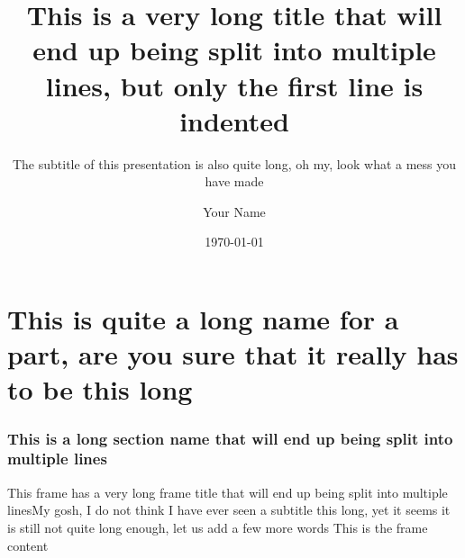 \documentclass[t]{beamer}
\title{This is a very long title that will end up being split into multiple lines, but only the first line is indented}
\subtitle{The subtitle of this presentation is also quite long, oh my, look what a mess you have made}
\author{Your Name}
\institute{Your Institute}
\date{\today}
\begin{document}
\maketitle

\part{This is quite a long name for a part, are you sure that it really has to be this long}
\makepart

\section{This is a long section name that will end up being split into multiple lines}
\makesection

\begin{frame}{This frame has a very long frame title that will end up being split into multiple lines}{My gosh, I do not think I have ever seen a subtitle this long, yet it seems it is still not quite long enough, let us add a few more words}
  This is the frame content
\end{frame}
\end{document}
